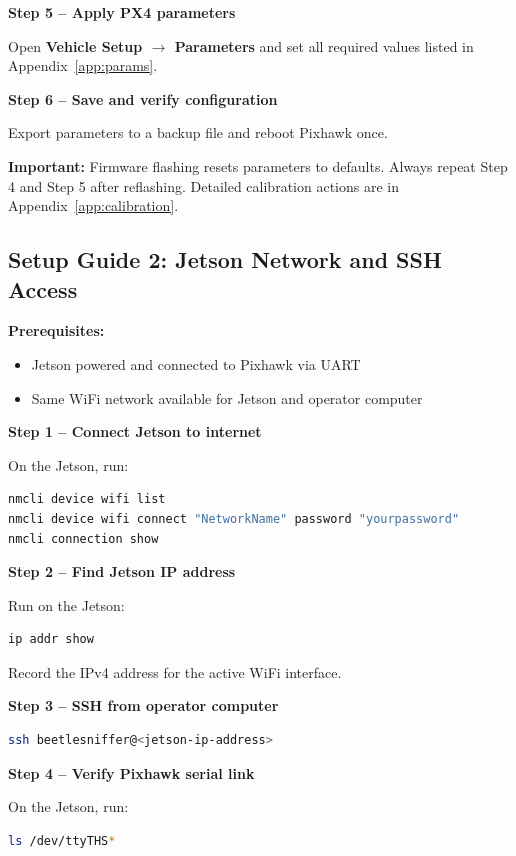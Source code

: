 \documentclass{article}
\begin{document}
\textbf{Step 5 -- Apply PX4 parameters}

Open \textbf{Vehicle Setup $\rightarrow$ Parameters} and set all required values listed in Appendix~\ref{app:params}.


\textbf{Step 6 -- Save and verify configuration}

Export parameters to a backup file and reboot Pixhawk once.


\textbf{Important:} Firmware flashing resets parameters to defaults. Always repeat Step 4 and Step 5 after reflashing. Detailed calibration actions are in Appendix~\ref{app:calibration}.

\subsection{Setup Guide 2: Jetson Network and SSH Access}
\label{sec:ssh}

\textbf{Prerequisites:}
\begin{itemize}
    \item Jetson powered and connected to Pixhawk via UART
    \item Same WiFi network available for Jetson and operator computer
\end{itemize}

\textbf{Step 1 -- Connect Jetson to internet}

On the Jetson, run:
\begin{lstlisting}[language=bash]
nmcli device wifi list
nmcli device wifi connect "NetworkName" password "yourpassword"
nmcli connection show
\end{lstlisting}


\textbf{Step 2 -- Find Jetson IP address}

Run on the Jetson:
\begin{lstlisting}[language=bash]
ip addr show
\end{lstlisting}

Record the IPv4 address for the active WiFi interface.


\textbf{Step 3 -- SSH from operator computer}

\begin{lstlisting}[language=bash]
ssh beetlesniffer@<jetson-ip-address>
\end{lstlisting}


\textbf{Step 4 -- Verify Pixhawk serial link}

On the Jetson, run:
\begin{lstlisting}[language=bash]
ls /dev/ttyTHS*
\end{lstlisting}
\end{document}
